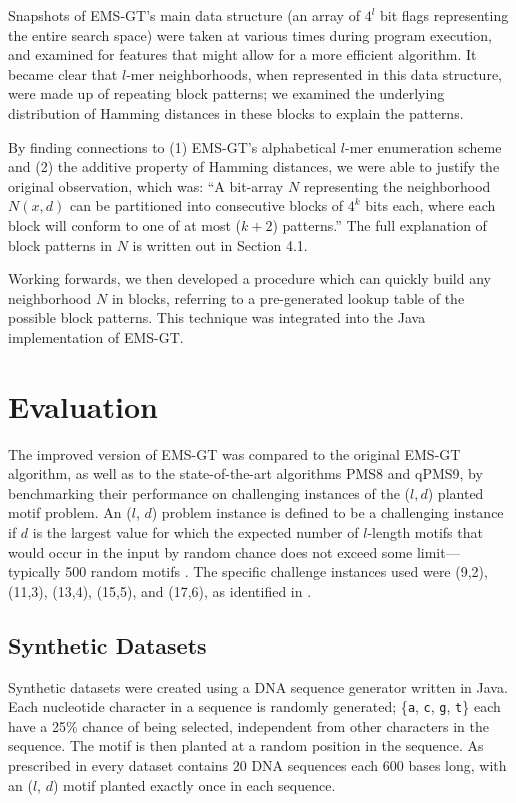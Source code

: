 \documentclass[oneside,12pt]{DISCSthesis}
\begin{document}
{		Snapshots of EMS-GT's main data structure (an array of $4^l$ bit flags representing the entire search space) were taken at various times during program execution, and examined for features that might allow for a more efficient algorithm. It became clear that $l$-mer neighborhoods, when represented in this data structure, were made up of repeating block patterns; we examined the underlying distribution of Hamming distances in these blocks to explain the patterns.

		By finding connections to (1) EMS-GT's alphabetical $l$-mer enumeration scheme and (2) the additive property of Hamming distances, we were able to justify the original observation, which was: ``A bit-array $N$ representing the neighborhood $N(x,d)$ can be partitioned into consecutive blocks of $4^k$ bits each, where each block will conform to one of at most ($k+2$) patterns.'' The full explanation of block patterns in $N$ is written out in Section 4.1.
		
		Working forwards, we then developed a procedure which can quickly build any neighborhood $N$ in blocks, referring to a pre-generated lookup table of the possible block patterns. This technique was integrated into the Java implementation of EMS-GT.

	\section{Evaluation}
		The improved version of EMS-GT was compared to the original EMS-GT algorithm, as well as to the state-of-the-art algorithms PMS8 and qPMS9, by benchmarking their performance on challenging instances of the ($l, d$) planted motif problem. An ($l$, $d$) problem instance is defined to be a challenging instance if $d$ is the largest value for which the expected number of $l$-length motifs that would occur in the input by random chance does not exceed some limit---typically 500 random motifs \cite{pms2015}. The specific challenge instances used were (9,2), (11,3), (13,4), (15,5), and (17,6), as identified in \cite{pms2015,pms2007}. 

		\subsection{Synthetic Datasets}
			Synthetic datasets were created using a DNA sequence generator written in Java. Each nucleotide character in a sequence is randomly generated; \{\texttt{a}, \texttt{c}, \texttt{g}, \texttt{t}\} each have a 25\% chance of being selected, independent from other characters in the sequence.
			The motif is then planted at a random position in the sequence. As prescribed in \cite{pevzner2000combinatorial} every dataset contains 20 DNA sequences each 600 bases long, with an ($l$, $d$) motif planted exactly once in each sequence.

}
\end{document}
